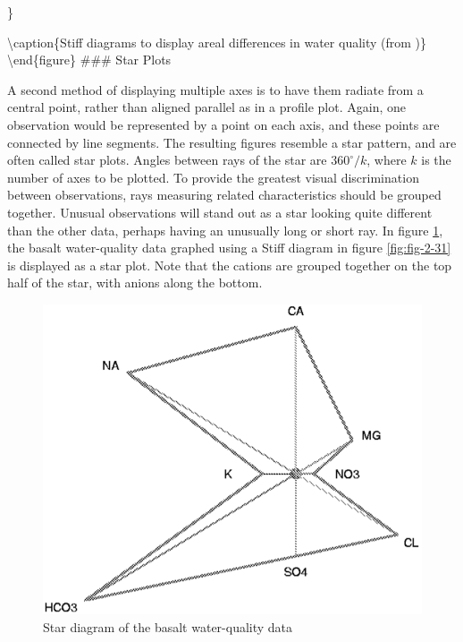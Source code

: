 \documentclass[]{book}
\begin{document}
\}

\textbackslash{}caption\{Stiff diagrams to display areal differences in water quality (from \citet{henderson_geochemistry_1985})\}\label{fig:fig-2-32}
\textbackslash{}end\{figure\}
\#\#\# Star Plots

A second method of displaying multiple axes is to have them radiate from a central point, rather than aligned parallel as in a profile plot. Again, one observation would be represented by a point on each axis, and these points are connected by line segments. The resulting figures resemble a star pattern, and are often called star plots. Angles between rays of the star are \(360^{\circ}/k\), where \(k\) is the number of axes to be plotted. To provide the greatest visual discrimination between observations, rays measuring related characteristics should be grouped together. Unusual observations will stand out as a star looking quite different than the other data, perhaps having an unusually long or short ray. In figure \ref{fig:fig-2-33}, the basalt water-quality data graphed using a Stiff diagram in figure \ref{fig:fig-2-31} is displayed as a star plot. Note that the cations are grouped together on the top half of the star, with anions along the bottom.

\begin{figure}

{\centering \includegraphics[width=9.99in]{figures/2_33} 

}

\caption{Star diagram of the basalt water-quality data}\label{fig:fig-2-33}
\end{figure}
\end{document}
